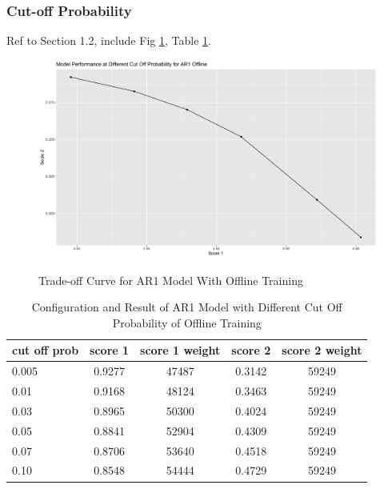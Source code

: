 \documentclass{article}
\begin{document}
\subsubsection{Cut-off Probability}
Ref to Section 1.2, include Fig \ref{fig:fig1.2.1}, Table \ref{tab:tab1.2.1}.

\begin{figure}
    \caption{Trade-off Curve for AR1 Model With Offline Training}
    \centering
    \includegraphics{images/ModelPerformanceatDifferentCutOffProbabilityforAR1Offline.png}
    \label{fig:fig1.2.1}
\end{figure}

\begin{table}[htbp]
  \begin{center}
    \caption{Configuration and Result of AR1 Model with Different Cut Off Probability of Offline Training}
    \label{tab:tab1.2.1}
    \begin{tabular}{l|*{4}{c}}
      \textbf{cut off prob} & \textbf{score 1} & \textbf{score 1 weight} & \textbf{score 2} & \textbf{score 2 weight} \\
      \hline
      0.005 & 0.9277 & 47487 & 0.3142 & 59249\\
      0.01 & 0.9168 & 48124 & 0.3463 & 59249\\
      0.03 & 0.8965 & 50300 & 0.4024 & 59249\\
      0.05 & 0.8841 & 52904 & 0.4309 & 59249\\
      0.07 & 0.8706 & 53640 & 0.4518 & 59249\\
      0.10 & 0.8548 & 54444 & 0.4729 & 59249\\
    \end{tabular}
  \end{center}
\end{table}
\end{document}
